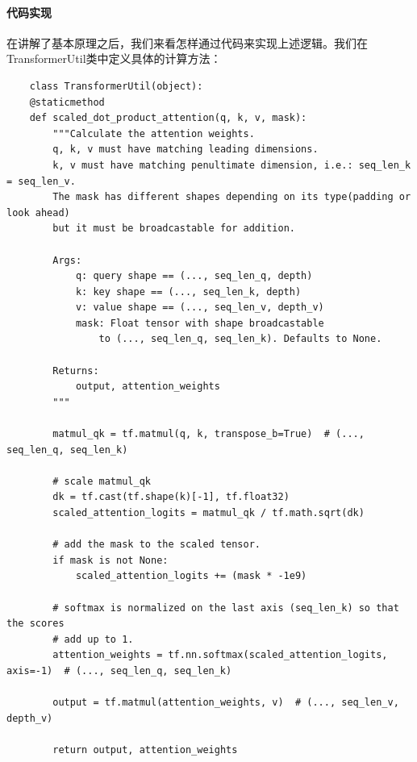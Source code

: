 \documentclass{article}
\begin{document}
\paragraph{代码实现}
在讲解了基本原理之后，我们来看怎样通过代码来实现上述逻辑。我们在TransformerUtil类中定义具体的计算方法：
\begin{lstlisting}
    class TransformerUtil(object):
    @staticmethod
    def scaled_dot_product_attention(q, k, v, mask):
        """Calculate the attention weights.
        q, k, v must have matching leading dimensions.
        k, v must have matching penultimate dimension, i.e.: seq_len_k = seq_len_v.
        The mask has different shapes depending on its type(padding or look ahead) 
        but it must be broadcastable for addition.
        
        Args:
            q: query shape == (..., seq_len_q, depth)
            k: key shape == (..., seq_len_k, depth)
            v: value shape == (..., seq_len_v, depth_v)
            mask: Float tensor with shape broadcastable 
                to (..., seq_len_q, seq_len_k). Defaults to None.
            
        Returns:
            output, attention_weights
        """

        matmul_qk = tf.matmul(q, k, transpose_b=True)  # (..., seq_len_q, seq_len_k)
        
        # scale matmul_qk
        dk = tf.cast(tf.shape(k)[-1], tf.float32)
        scaled_attention_logits = matmul_qk / tf.math.sqrt(dk)

        # add the mask to the scaled tensor.
        if mask is not None:
            scaled_attention_logits += (mask * -1e9)

        # softmax is normalized on the last axis (seq_len_k) so that the scores
        # add up to 1.
        attention_weights = tf.nn.softmax(scaled_attention_logits, axis=-1)  # (..., seq_len_q, seq_len_k)

        output = tf.matmul(attention_weights, v)  # (..., seq_len_v, depth_v)

        return output, attention_weights


\end{lstlisting}
\end{document}
